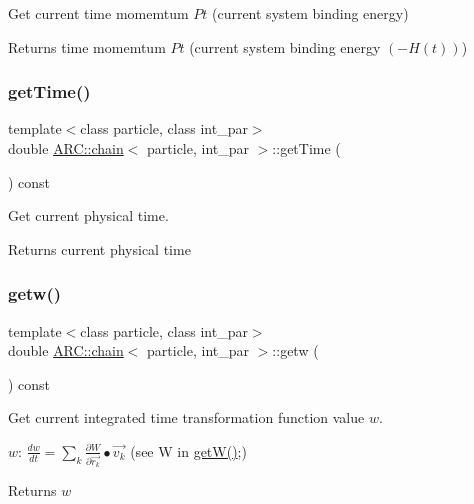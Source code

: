Get current time momemtum $Pt$ (current system binding energy) 

\begin{DoxyReturn}{Returns}
time momemtum $Pt$ (current system binding energy $(-H(t))$) 
\end{DoxyReturn}
\hypertarget{classARC_1_1chain_ad21bc515c01cf62e65d6d749d8babd63}{}\label{classARC_1_1chain_ad21bc515c01cf62e65d6d749d8babd63} 
\subsubsection{\texorpdfstring{get\+Time()}{getTime()}}
{\footnotesize\ttfamily template$<$class particle, class int\+\_\+par$>$ \\
double \hyperlink{classARC_1_1chain}{A\+R\+C\+::chain}$<$ particle, int\+\_\+par $>$\+::get\+Time (\begin{DoxyParamCaption}{ }\end{DoxyParamCaption}) const\hspace{0.3cm}{\ttfamily [inline]}}



Get current physical time. 

\begin{DoxyReturn}{Returns}
current physical time 
\end{DoxyReturn}
\hypertarget{classARC_1_1chain_abdd62eb43e4a7b5eca10190c90ed190f}{}\label{classARC_1_1chain_abdd62eb43e4a7b5eca10190c90ed190f} 
\subsubsection{\texorpdfstring{getw()}{getw()}}
{\footnotesize\ttfamily template$<$class particle, class int\+\_\+par$>$ \\
double \hyperlink{classARC_1_1chain}{A\+R\+C\+::chain}$<$ particle, int\+\_\+par $>$\+::getw (\begin{DoxyParamCaption}{ }\end{DoxyParamCaption}) const\hspace{0.3cm}{\ttfamily [inline]}}



Get current integrated time transformation function value $w$. 

$w$\+: $ \frac{dw}{dt} = \sum_k \frac{\partial W}{\partial \vec{r_k}} \bullet \vec{v_k} $ (see W in \hyperlink{classARC_1_1chain_abcfc20c1694a1d68a324ea9a08863af3}{get\+W()};) \begin{DoxyReturn}{Returns}
$w$ 
\end{DoxyReturn}
\hypertarget{classARC_1_1chain_abcfc20c1694a1d68a324ea9a08863af3}{}\label{classARC_1_1chain_abcfc20c1694a1d68a324ea9a08863af3} 
